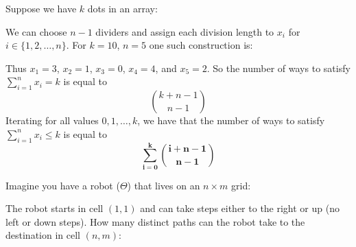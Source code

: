 \documentclass[answers]{exam}
\begin{document}
\begin{questions}
	\begin{solution}
	Suppose we have $k$ dots in an array:
	\begin{center}
	\end{center}
	We can choose $n - 1$ dividers and assign each division length to $x_i$ for $i \in \{1, 2, \dots, n\}$. For $k = 10$, $n = 5$ one such construction is:
	\begin{center}
	\end{center}
	Thus $x_1 = 3$, $x_2 = 1$, $x_3 = 0$, $x_4 = 4$, and $x_5 = 2$. So the number of ways to satisfy $\sum_{i=1}^n x_i = k$ is equal to
	\[{k + n - 1 \choose n - 1}\]
	Iterating for all values $0, 1, \dots, k$, we have that the number of ways to satisfy $\sum_{i=1}^n x_i \leq k$ is equal to
	\[\bm{\sum_{i = 0}^k {i + n - 1 \choose n - 1}}\]
	\end{solution}
	
	\question Imagine you have a robot ($\Theta$) that lives on an $n \times m$ grid:
	\begin{center}
	\end{center}
	The robot starts in cell $(1, 1)$ and can take steps either to the right or up (no left or down steps). How many distinct paths can the robot take to the destination in cell $(n, m)$:
\end{questions}
\end{document}
